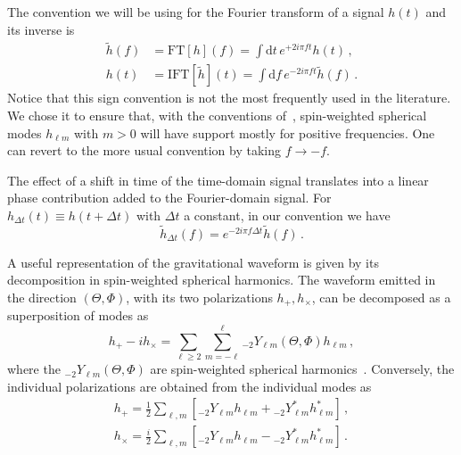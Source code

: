 \documentclass[aps,showpacs,twocolumn,
prd,superscriptaddress,nofootinbib]{revtex4-1}
\newcommand{\be}{\begin{equation}}
\newcommand{\ee}{\end{equation}}
\newcommand\ud{{\mathrm{d}}}
\begin{document}
The convention we will be using for the Fourier transform of a signal $h(t)$ and its inverse is
\begin{subequations}
\label{eq:defFT}
\begin{align}
	\tilde{h}(f) &= \mathrm{FT}[h](f) =  \int \ud t \, e^{+2i\pi f t} h(t) \,, \\
	h(t) &= \mathrm{IFT}[\tilde{h}](t) =  \int \ud f \, e^{-2i\pi f t} \tilde{h}(f) \,.
\end{align}
\end{subequations}
Notice that this sign convention is not the most frequently used in the literature. We chose it to ensure that, with the conventions of~\cite{BlanchetLiving}, spin-weighted spherical modes $h_{\ell m}$ with $m>0$ will have support mostly for positive frequencies. One can revert to the more usual convention by taking $f\rightarrow -f$.

The effect of a shift in time of the time-domain signal translates into a linear phase contribution added to the Fourier-domain signal. For $h_{\Delta t}(t) \equiv h(t+\Delta t)$ with $\Delta t$ a constant, in our convention we have
\be\label{eq:shifttime}
	\tilde{h}_{\Delta t} (f) = e^{-2i\pi f \Delta t} \tilde{h}(f) \,.
\ee

A useful representation of the gravitational waveform is given by its decomposition in spin-weighted spherical harmonics. The waveform emitted in the direction $(\Theta, \Phi)$, with its two polarizations $h_{+},h_{\times}$, can be decomposed as a superposition of modes as~\cite{Thorne80}
\be\label{eq:defmodes}
	h_{+} - i h_{\times} = \sum\limits_{\ell \geq 2} \sum\limits_{m=-\ell}^{\ell} {}_{-2}Y_{\ell m}(\Theta,\Phi) h_{\ell m} \,,
\ee
where the ${}_{-2}Y_{\ell m}(\Theta,\Phi)$ are spin-weighted spherical harmonics~\cite{Goldberg+67}. Conversely, the individual polarizations are obtained from the individual modes as
\begin{subequations}
\begin{align}
	h_{+} = \frac{1}{2} \sum\limits_{\ell, m} \left[ {}_{-2}Y_{\ell m}h_{\ell m} + {}_{-2}Y_{\ell m}^{*} h_{\ell m}^{*} \right] \,,\\
	h_{\times} = \frac{i}{2} \sum\limits_{\ell, m} \left[ {}_{-2}Y_{\ell m}h_{\ell m} - {}_{-2}Y_{\ell m}^{*} h_{\ell m}^{*} \right] \,.
\end{align}
\end{subequations}
\end{document}
